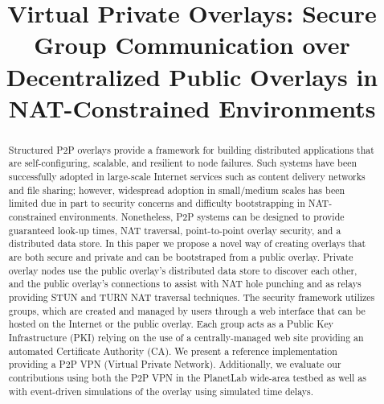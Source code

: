 \documentclass[conference]{IEEEtran}
\begin{document}
\title{Virtual Private Overlays: Secure Group Communication over Decentralized
Public Overlays in NAT-Constrained Environments}

\author{ 
}

\maketitle

\begin{abstract}
Structured P2P overlays provide a framework for building distributed applications that
are self-configuring, scalable, and resilient to node failures.  Such systems
have been successfully adopted in large-scale Internet services such as content
delivery networks and file sharing; however, widespread adoption in small/medium
scales has been limited due in part to security concerns and difficulty
bootstrapping in NAT-constrained environments.  Nonetheless, P2P systems can be designed to
provide guaranteed look-up times, NAT traversal, point-to-point overlay
security, and a distributed data store. In this paper we propose
a novel way of creating overlays that are both secure and
private and can be bootstraped from a public overlay.
Private overlay nodes use the public overlay's distributed data store to discover
each other, and the public overlay's connections to assist with NAT hole punching
and as relays providing STUN and TURN NAT traversal techniques.  The security
framework utilizes groups, which are created and managed by users through
a web interface that can be hosted on the Internet or the public overlay.
Each group acts as a Public Key Infrastructure (PKI) relying on
the use of a centrally-managed web site providing an automated Certificate
Authority (CA).  We present a reference implementation providing a P2P VPN
(Virtual Private Network).  Additionally, we evaluate our contributions using
both the P2P VPN in the PlanetLab wide-area testbed as well as with event-driven
simulations of the overlay using simulated time delays.
\end{abstract}
\end{document}

